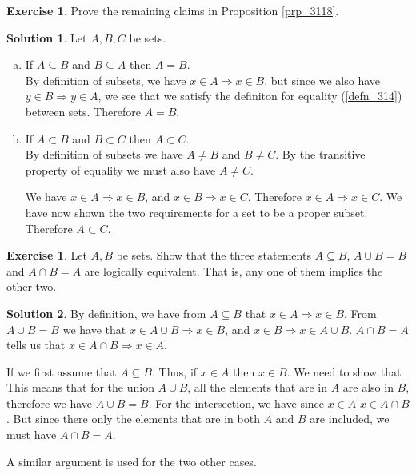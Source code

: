 \documentclass[a4paper, twocolumn]{report}
\newcounter{exercise} \numberwithin{exercise}{section}
\theoremstyle{definition}
\newtheorem{exc}[exercise]{Exercise}
\theoremstyle{solution}
\newtheorem*{sltn}{Solution}
\newcommand{\union}{\cup}
\newcommand{\intrsct}{\cap}
\begin{document}
\begin{exc}
  Prove the remaining claims in Proposition \ref{prp_3118}.
\end{exc}
\begin{sltn}
  Let $A, B, C$ be sets.
  \begin{enumerate}[(a)]
    \item If $A \subseteq B$ and $B \subseteq A$ then $A = B$. \\
      [0.2cm]
      By definition of subsets, we have $x \in A \Rightarrow x \in B$, but
      since we also have $y \in B \Rightarrow y \in A$, we see that we satisfy
      the definiton for equality (\ref{defn_314}) between sets. Therefore $A =
      B$. 

    \item If $A \subset B$ and $B \subset C$ then $A \subset C$. \\
      By definition of subsets we have $A \neq B$ and $B \neq C$. By the
      transitive property of equality we must also have $A \neq C$. 

      We have $x \in A \Rightarrow x \in B$, and $x \in B \Rightarrow x \in C$.
      Therefore $x \in A \Rightarrow x \in C$.  We have now shown the two
      requirements for a set to be a proper subset. Therefore $A \subset C$.
  \end{enumerate} 
\end{sltn}

\begin{exc}
  Let $A, B$ be sets. Show that the three statements $A \subseteq B$, $A \union
  B = B$ and $A \intrsct B = A$ are logically equivalent. That is, any one of
  them implies the other two.

\end{exc}
\begin{sltn}
  By definition, we have from $A \subseteq B$ that $x \in A \Rightarrow x \in
  B$.  From $A \union B = B$ we have that $x \in A \union B \Rightarrow x \in
  B$, and $x \in B \Rightarrow x \in A \union B$.  $A \intrsct B = A$ tells us
  that $ x \in A \intrsct B \Rightarrow x \in A$.

  If we first assume that $A \subseteq B$. Thus, if $x \in A$ then $x \in B$.
  We need to show that This means that for the union $A \union B$, all the
  elements that are in $A$ are also in $B$, therefore we have $A \union B = B$.
  For the intersection, we have since $x \in A$ $x \in A \intrsct B$. But since
  there only the elements that are in both $A$ and $B$ are included, we must
  have $A \intrsct B = A$. 

  A similar argument is used for the two other cases.
\end{sltn}
\end{document}
